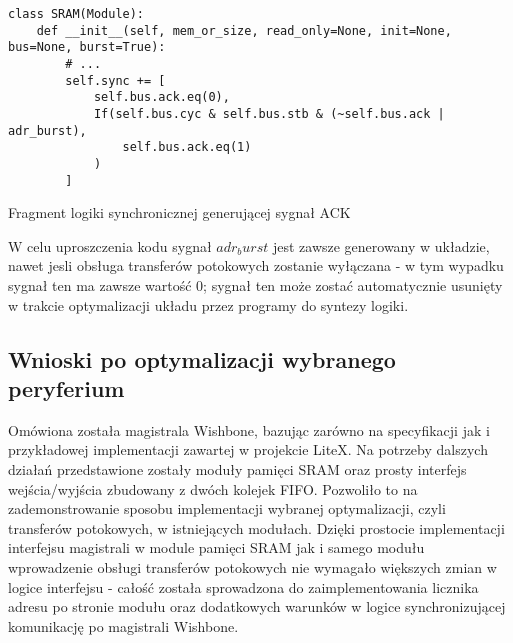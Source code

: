 \begin{listing}[H]
\begin{verbatim}
class SRAM(Module):
    def __init__(self, mem_or_size, read_only=None, init=None, bus=None, burst=True):
        # ...
        self.sync += [
            self.bus.ack.eq(0),
            If(self.bus.cyc & self.bus.stb & (~self.bus.ack | adr_burst),
                self.bus.ack.eq(1)
            )
        ]
\end{verbatim}
\caption{\label{lst:impl-sram-adrnext}Fragment logiki synchronicznej generującej sygnał ACK}
\end{listing}

W celu uproszczenia kodu sygnał $adr_burst$ jest zawsze generowany w układzie, nawet jesli obsługa transferów potokowych zostanie wyłączana - w tym wypadku sygnał ten ma zawsze wartość $0$; sygnał ten może zostać automatycznie usunięty w trakcie optymalizacji układu przez programy do syntezy logiki.

\subsection{Wnioski po optymalizacji wybranego peryferium}

Omówiona została magistrala Wishbone, bazując zarówno na specyfikacji jak i przykładowej implementacji zawartej w projekcie LiteX.
Na potrzeby dalszych działań przedstawione zostały moduły pamięci SRAM oraz prosty interfejs wejścia/wyjścia zbudowany z dwóch kolejek FIFO. Pozwoliło to na zademonstrowanie sposobu implementacji wybranej optymalizacji, czyli transferów potokowych, w istniejących modułach.
Dzięki prostocie implementacji interfejsu magistrali w module pamięci SRAM jak i samego modułu wprowadzenie obsługi transferów potokowych nie wymagało większych zmian w logice interfejsu - całość została sprowadzona do zaimplementowania licznika adresu po stronie modułu oraz dodatkowych warunków w logice synchronizującej komunikację po magistrali Wishbone.
